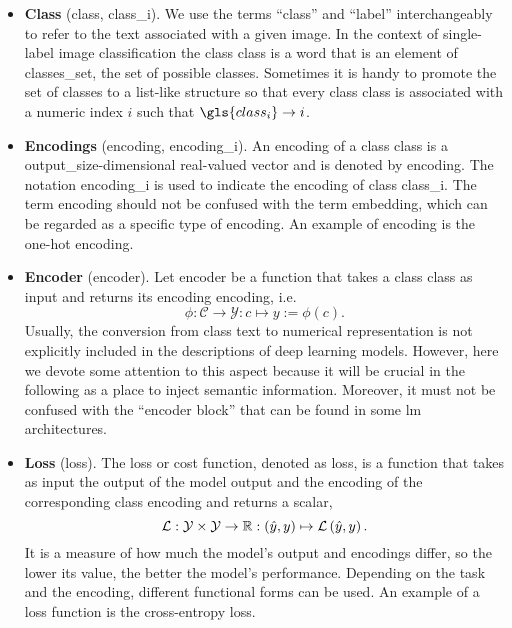 \begin{itemize}
\item \textbf{Class} (\gls{class}, \gls{class_i}). We use the terms ``class'' and ``label'' interchangeably to refer to the text associated with a given image. In the context of single-label image classification the class \gls{class} is a word that is an element of \gls{classes_set}, the set of possible classes. Sometimes it is handy to promote the set of classes to a list-like structure so that every class \gls{class} is associated with a numeric index $i$ such that $\gls{class_i} \to i$.

\item \textbf{Encodings} (\gls{encoding}, \gls{encoding_i}). An encoding of a class \gls{class} is a \gls{output_size}-dimensional real-valued vector and is denoted by \gls{encoding}. The notation \gls{encoding_i} is used to indicate the encoding of class \gls{class_i}. The term encoding should not be confused with the term embedding, which can be regarded as a specific type of encoding. An example of encoding is the one-hot encoding.

\item \textbf{Encoder} (\gls{encoder}). Let \gls{encoder} be a function that takes a class \gls{class} as input and returns its encoding \gls{encoding}, i.e.\
\begin{equation}
  \phi: \mathcal{C} \to \mathcal{Y} : c \mapsto y := \phi \left(c\right).
  \label{eq:encoder}
\end{equation}
Usually, the conversion from class text to numerical representation is not explicitly included in the descriptions of deep learning models. However, here we devote some attention to this aspect because it will be crucial in the following as a place to inject semantic information. Moreover, it must not be confused with the ``encoder block'' that can be found in some \acrshort{lm} architectures.

\item \textbf{Loss} (\gls{loss}). The loss or cost function, denoted as \gls{loss}, is a function that takes as input the output of the model \gls{output} and the encoding of the corresponding class \gls{encoding} and returns a scalar,
\begin{equation}
  \operatorname{\mathcal{L}}: \mathcal{Y} \times \mathcal{Y} \to \mathbb{R}
       : \left(\hat{y}, y\right) \mapsto \operatorname{\mathcal{L}} \left(\hat{y}, y\right).
  \label{eq:loss}
\end{equation}
It is a measure of how much the model's output and encodings differ, so the lower its value, the better the model's performance. Depending on the task and the encoding, different functional forms can be used. An example of a loss function is the cross-entropy loss.

\end{itemize}

